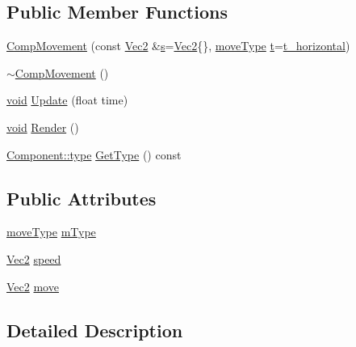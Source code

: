 \subsection*{Public Member Functions}
\begin{DoxyCompactItemize}
\item 
\hyperlink{class_comp_movement_a1979cc3ed3109370762d40c7a3f2786f}{Comp\-Movement} (const \hyperlink{class_vec2}{Vec2} \&\hyperlink{_s_d_l__opengl_8h_a4af680a6c683f88ed67b76f207f2e6e4}{s}=\hyperlink{class_vec2}{Vec2}\{\}, \hyperlink{class_comp_movement_a5be67228360a37b9032bd70d44856c83}{move\-Type} \hyperlink{_s_d_l__opengl_8h_a7d65d00ca3b0630d9b5c52df855b19f5}{t}=\hyperlink{class_comp_movement_a5be67228360a37b9032bd70d44856c83a1cd5577a817502a6c18ee1ee928da3d8}{t\-\_\-horizontal})
\item 
\hyperlink{class_comp_movement_aede23cf3ec622ac7089cd2fa672129da}{$\sim$\-Comp\-Movement} ()
\item 
\hyperlink{_s_d_l__opengles2__gl2ext_8h_ae5d8fa23ad07c48bb609509eae494c95}{void} \hyperlink{class_comp_movement_a9d20396d3bf2646bb8e0d2fffc0cccd0}{Update} (float time)
\item 
\hyperlink{_s_d_l__opengles2__gl2ext_8h_ae5d8fa23ad07c48bb609509eae494c95}{void} \hyperlink{class_comp_movement_ad387deb1874044cca15dd58a014e3544}{Render} ()
\item 
\hyperlink{class_component_ad6d161b6acf7b843b55bb9feac7af71a}{Component\-::type} \hyperlink{class_comp_movement_a922f5115a34e151e9414141ac8f0c324}{Get\-Type} () const 
\end{DoxyCompactItemize}
\subsection*{Public Attributes}
\begin{DoxyCompactItemize}
\item 
\hyperlink{class_comp_movement_a5be67228360a37b9032bd70d44856c83}{move\-Type} \hyperlink{class_comp_movement_a3ce2f7a3d0feb7684213440ec2f971a9}{m\-Type}
\item 
\hyperlink{class_vec2}{Vec2} \hyperlink{class_comp_movement_acbead672c47587a0221fae8ecd97258e}{speed}
\item 
\hyperlink{class_vec2}{Vec2} \hyperlink{class_comp_movement_a3c73427a019d8457e239bacaaf30882f}{move}
\end{DoxyCompactItemize}


\subsection{Detailed Description}


